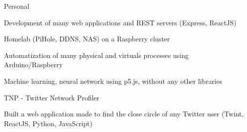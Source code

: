 
\begin{cventries}
  \cventry
    {} %
    {Personal} %
    {} %
    {} %
    {
      \begin{cvitems} %
        \item {Development of many web applications and REST servers (Express, ReactJS)}
        \item {Homelab (PiHole, DDNS, NAS) on a Raspberry cluster}
		\item {Automatization of many physical and virtuals processes using Arduino/Raspberry}
        \item {Machine learning, neural network using p5.js, without any other libraries}
      \end{cvitems}
    }

  \cventry
    {} %
    {TNP - Twitter Network Profiler} %
    {} %
    {} %
    {
      \begin{cvitems} %
      	\item {Built a web application made to find the close circle of any Twitter user (Twint, ReactJS, Python, JavaScript)}
      \end{cvitems}
    }
    
\end{cventries}